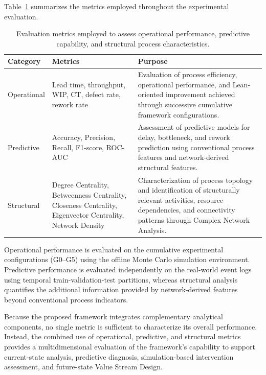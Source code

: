 \documentclass[pdflatex,iicol,Numbered,sn-basic]{sn-jnl}
\begin{document}
Table~\ref{tab:evaluation_metrics} summarizes the metrics employed throughout the experimental evaluation.

\begin{table}[t]
\caption{
Evaluation metrics employed to assess operational performance, predictive capability, and structural process characteristics.
}
\label{tab:evaluation_metrics}
\centering
\begin{tabularx}{\textwidth}{p{2.5cm}p{4.8cm}X}
\toprule
\textbf{Category} &
\textbf{Metrics} &
\textbf{Purpose} \\
\midrule

Operational
&
Lead time, throughput, WIP, CT, defect rate, rework rate
&
Evaluation of process efficiency, operational performance, and Lean-oriented improvement achieved through successive cumulative framework configurations.
\\

Predictive
&
Accuracy, Precision, Recall, F1-score, ROC-AUC
&
Assessment of predictive models for delay, bottleneck, and rework prediction using conventional process features and network-derived structural features.
\\

Structural
&
Degree Centrality, Betweenness Centrality, Closeness Centrality, Eigenvector Centrality, Network Density
&
Characterization of process topology and identification of structurally relevant activities, resource dependencies, and connectivity patterns through Complex Network Analysis.
\\

\bottomrule
\end{tabularx}
\end{table}

Operational performance is evaluated on the cumulative experimental configurations (G0--G5) using the offline Monte Carlo simulation environment. Predictive performance is evaluated independently on the real-world event logs using temporal train-validation-test partitions, whereas structural analysis quantifies the additional information provided by network-derived features beyond conventional process indicators.

Because the proposed framework integrates complementary analytical components, no single metric is sufficient to characterize its overall performance. Instead, the combined use of operational, predictive, and structural metrics provides a multidimensional evaluation of the framework's capability to support current-state analysis, predictive diagnosis, simulation-based intervention assessment, and future-state Value Stream Design.
\end{document}
